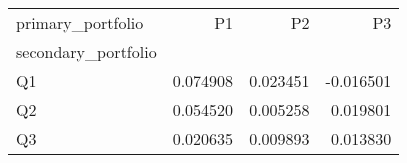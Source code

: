 \begin{tabular}{lrrr}
\toprule
primary_portfolio & P1 & P2 & P3 \\
secondary_portfolio &  &  &  \\
\midrule
Q1 & 0.074908 & 0.023451 & -0.016501 \\
Q2 & 0.054520 & 0.005258 & 0.019801 \\
Q3 & 0.020635 & 0.009893 & 0.013830 \\
\bottomrule
\end{tabular}
